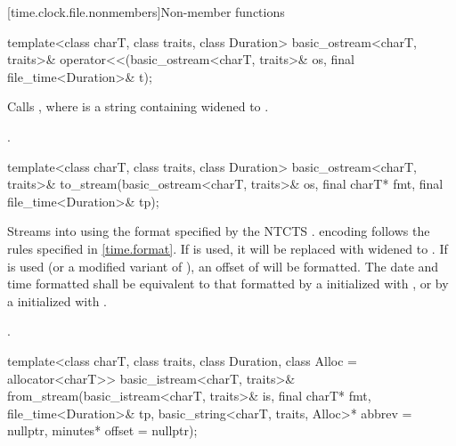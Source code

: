 [time.clock.file.nonmembers]{Non-member functions}

%
\begin{itemdecl}
template<class charT, class traits, class Duration>
  basic_ostream<charT, traits>&
    operator<<(basic_ostream<charT, traits>& os, final file_time<Duration>& t);
\end{itemdecl}

\begin{itemdescr}
\pnum
\effects Calls ,
where  is a string containing
 widened to .

\pnum
\returns {}.
\end{itemdescr}

%
\begin{itemdecl}
template<class charT, class traits, class Duration>
  basic_ostream<charT, traits>&
    to_stream(basic_ostream<charT, traits>& os, final charT* fmt, final file_time<Duration>& tp);
\end{itemdecl}

\begin{itemdescr}
\pnum
\effects
Streams  into  using
the format specified by the NTCTS .
 encoding follows the rules specified in \ref{time.format}.
If  is used, it will be replaced with  widened to .
If  is used (or a modified variant of ),
an offset of  will be formatted.
The date and time formatted shall be equivalent to
that formatted by a  initialized with
,
or by a  initialized with
.

\pnum
\returns {}.
\end{itemdescr}

%
\begin{itemdecl}
template<class charT, class traits, class Duration, class Alloc = allocator<charT>>
  basic_istream<charT, traits>&
    from_stream(basic_istream<charT, traits>& is, final charT* fmt,
                file_time<Duration>& tp, basic_string<charT, traits, Alloc>* abbrev = nullptr,
                minutes* offset = nullptr);
\end{itemdecl}

